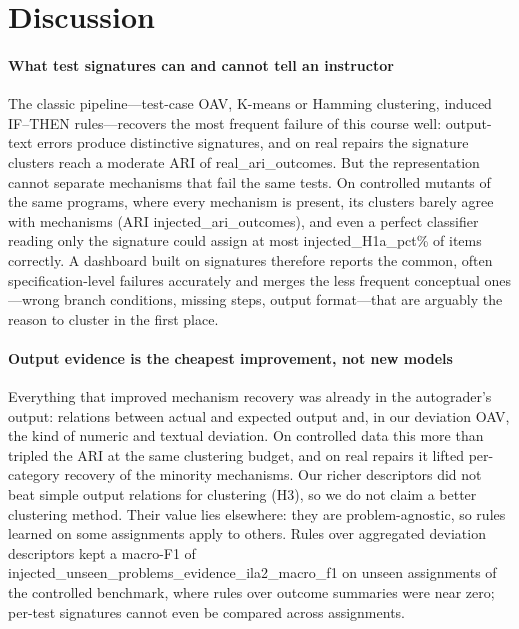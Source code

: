 \section{Discussion}\label{sec:discussion}

\paragraph{What test signatures can and cannot tell an instructor}
The classic pipeline---test-case OAV, K-means or Hamming clustering, induced IF--THEN rules---recovers the most frequent failure of this course well: output-text errors produce distinctive signatures, and on real repairs the signature clusters reach a moderate ARI of {{real_ari_outcomes}}. But the representation cannot separate mechanisms that fail the same tests. On controlled mutants of the same programs, where every mechanism is present, its clusters barely agree with mechanisms (ARI {{injected_ari_outcomes}}), and even a perfect classifier reading only the signature could assign at most {{injected_H1a_pct}}\% of items correctly. A dashboard built on signatures therefore reports the common, often specification-level failures accurately and merges the less frequent conceptual ones---wrong branch conditions, missing steps, output format---that are arguably the reason to cluster in the first place.

\paragraph{Output evidence is the cheapest improvement, not new models}
Everything that improved mechanism recovery was already in the autograder's output: relations between actual and expected output and, in our deviation OAV, the kind of numeric and textual deviation. On controlled data this more than tripled the ARI at the same clustering budget, and on real repairs it lifted per-category recovery of the minority mechanisms. Our richer descriptors did not beat simple output relations for clustering (H3), so we do not claim a better clustering method. Their value lies elsewhere: they are problem-agnostic, so rules learned on some assignments apply to others. Rules over aggregated deviation descriptors kept a macro-F1 of {{injected_unseen_problems_evidence_ila2_macro_f1}} on unseen assignments of the controlled benchmark, where rules over outcome summaries were near zero; per-test signatures cannot even be compared across assignments.

